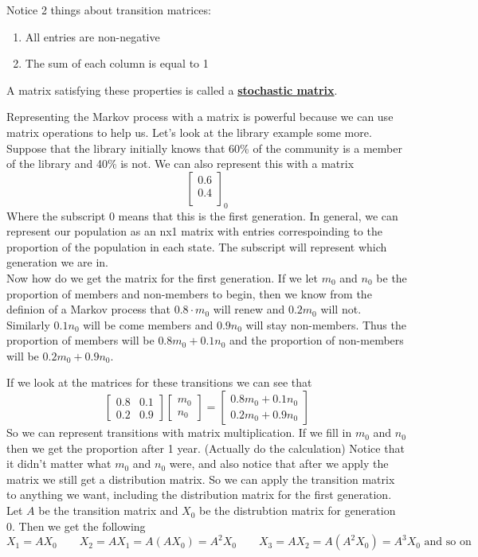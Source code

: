 \documentclass[14,fleqn]{article}
\newcommand{\defn}[1]{\textbf{\underline{#1}}}
\begin{document}
Notice 2 things about transition matrices:
\begin{enumerate}
	\item All entries are non-negative
	\item The sum of each column is equal to 1
\end{enumerate}
A matrix satisfying these properties is called a \defn{stochastic matrix}.


Representing the Markov process with a matrix is powerful because we can use matrix operations to help us. Let's look at the library example some more. Suppose that the library initially knows that 60\% of the community is a member of the library and 40\% is not. We can also represent this with a matrix
\[
	\begin{bmatrix}
		0.6\\
		0.4\\
	\end{bmatrix}_0
\]
Where the subscript 0 means that this is the first generation. In general, we can represent our population as an nx1 matrix with entries correspoinding to the proportion of the population in each state. The subscript will represent which generation we are in.\\

Now how do we get the matrix for the first generation. If we let $m_0$ and $n_0$ be the proportion of members and non-members to begin, then we know from the definion of a Markov process that $0.8\cdot m_0$ will renew and $0.2m_0$ will not. Similarly $0.1n_0$ will be come members and $0.9n_0$ will stay non-members. Thus the proportion of members will be $0.8m_0+0.1n_0$ and the proportion of non-members will be $0.2m_0+0.9n_0.$

If we look at the matrices for these transitions we can see that
\[
	\begin{bmatrix}
		0.8&0.1\\
		0.2&0.9
	\end{bmatrix}
	\begin{bmatrix}
		m_0\\
		n_0
	\end{bmatrix}
	=\begin{bmatrix}
		0.8m_0+0.1n_0\\
		0.2m_0+0.9n_0
	\end{bmatrix}
\]
So we can represent transitions with matrix multiplication. If we fill in $m_0$ and $n_0$ then we get the proportion after 1 year. (Actually do the calculation) Notice that it didn't matter what $m_0$ and $n_0$ were, and also notice that after we apply the matrix we still get a distribution matrix. So we can apply the transition matrix to anything we want, including the distribution matrix for the first generation. Let $A$ be the transition matrix and $X_0$ be the distrubtion matrix for generation 0. Then we get the following
\[
	X_1=AX_0\qquad X_2=AX_1=A(AX_0)=A^2X_0\qquad X_3=AX_2=A(A^2X_0)=A^3X_0 \text{ and so on}
\]
\end{document}
